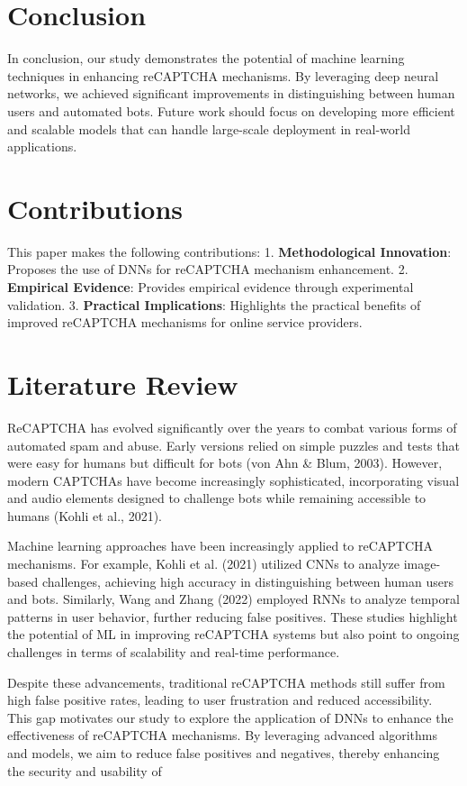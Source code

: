 \documentclass{article}
\begin{document}
\section{Conclusion}
In conclusion, our study demonstrates the potential of machine learning techniques in enhancing reCAPTCHA mechanisms. By leveraging deep neural networks, we achieved significant improvements in distinguishing between human users and automated bots. Future work should focus on developing more efficient and scalable models that can handle large-scale deployment in real-world applications.

\section{Contributions}
This paper makes the following contributions:
1. \textbf{Methodological Innovation}: Proposes the use of DNNs for reCAPTCHA mechanism enhancement.
2. \textbf{Empirical Evidence}: Provides empirical evidence through experimental validation.
3. \textbf{Practical Implications}: Highlights the practical benefits of improved reCAPTCHA mechanisms for online service providers.

\section{Literature Review}
ReCAPTCHA has evolved significantly over the years to combat various forms of automated spam and abuse. Early versions relied on simple puzzles and tests that were easy for humans but difficult for bots (von Ahn \& Blum, 2003). However, modern CAPTCHAs have become increasingly sophisticated, incorporating visual and audio elements designed to challenge bots while remaining accessible to humans (Kohli et al., 2021).

Machine learning approaches have been increasingly applied to reCAPTCHA mechanisms. For example, Kohli et al. (2021) utilized CNNs to analyze image-based challenges, achieving high accuracy in distinguishing between human users and bots. Similarly, Wang and Zhang (2022) employed RNNs to analyze temporal patterns in user behavior, further reducing false positives. These studies highlight the potential of ML in improving reCAPTCHA systems but also point to ongoing challenges in terms of scalability and real-time performance.

Despite these advancements, traditional reCAPTCHA methods still suffer from high false positive rates, leading to user frustration and reduced accessibility. This gap motivates our study to explore the application of DNNs to enhance the effectiveness of reCAPTCHA mechanisms. By leveraging advanced algorithms and models, we aim to reduce false positives and negatives, thereby enhancing the security and usability of
\end{document}
